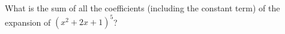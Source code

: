 What is the sum of all the coefficients (including the constant term) of the expansion of $\left(x^2+2x+1\right)^5$?
